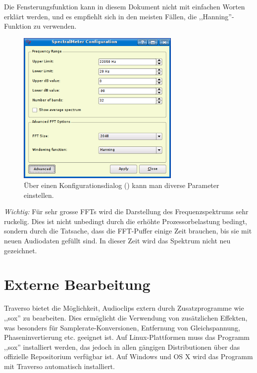 Die Fensterungsfunktion kann in diesem Dokument nicht mit einfachen Worten erklärt werden, und es empfiehlt sich in den meisten Fällen, die ,,Hanning''-Funktion zu verwenden.

\begin{figure}
	\centering
	\includegraphics[width=0.7\textwidth]{images/fft3}
	\caption{Über einen Konfigurationsdialog () kann man diverse Parameter einstellen.}
	\label{fig_fft3}
\end{figure}

\emph{Wichtig:} Für sehr grosse FFTs wird die Darstellung des Frequenzspektrums sehr ruckelig. Dies ist nicht unbedingt durch die erhöhte Prozessorbelastung bedingt, sondern durch die Tatsache, dass die FFT-Puffer einige Zeit brauchen, bis sie mit neuen Audiodaten gefüllt sind. In dieser Zeit wird das Spektrum nicht neu gezeichnet.

\section{Externe Bearbeitung}
Traverso bietet die Möglichkeit, Audioclips extern durch Zusatzprogramme wie ,,sox'' \cite{sox} zu bearbeiten. Dies ermöglicht die Verwendung von zusätzlichen Effekten, was besonders für Samplerate-Konversionen, Entfernung von Gleichspannung, Phaseninvertierung etc. geeignet ist. Auf Linux-Plattformen muss das Programm ,,sox'' installiert werden, das jedoch in allen gängigen Distributionen über das offizielle Repositorium verfügbar ist. Auf Windows und OS X wird das Programm mit Traverso automatisch installiert.

